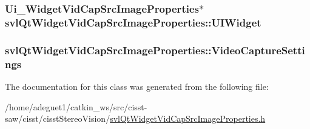 \hypertarget{classsvl_qt_widget_vid_cap_src_image_properties_ac38817abd20ff403980a47cf9c237b48}{
\subsubsection[{U\-I\-Widget}]{\setlength{\rightskip}{0pt plus 5cm}Ui\-\_\-\-Widget\-Vid\-Cap\-Src\-Image\-Properties$\ast$ svl\-Qt\-Widget\-Vid\-Cap\-Src\-Image\-Properties\-::\-U\-I\-Widget\hspace{0.3cm}{\ttfamily [protected]}}}\label{classsvl_qt_widget_vid_cap_src_image_properties_ac38817abd20ff403980a47cf9c237b48}
\hypertarget{classsvl_qt_widget_vid_cap_src_image_properties_afbb8469c066f6acc9cc475f32cca47e6}{
\subsubsection[{Video\-Capture\-Settings}]{ svl\-Qt\-Widget\-Vid\-Cap\-Src\-Image\-Properties\-::\-Video\-Capture\-Settings}}\label{classsvl_qt_widget_vid_cap_src_image_properties_afbb8469c066f6acc9cc475f32cca47e6}


The documentation for this class was generated from the following file\-:\begin{DoxyCompactItemize}
\item 
/home/adeguet1/catkin\-\_\-ws/src/cisst-\/saw/cisst/cisst\-Stereo\-Vision/\hyperlink{svl_qt_widget_vid_cap_src_image_properties_8h}{svl\-Qt\-Widget\-Vid\-Cap\-Src\-Image\-Properties.\-h}\end{DoxyCompactItemize}
